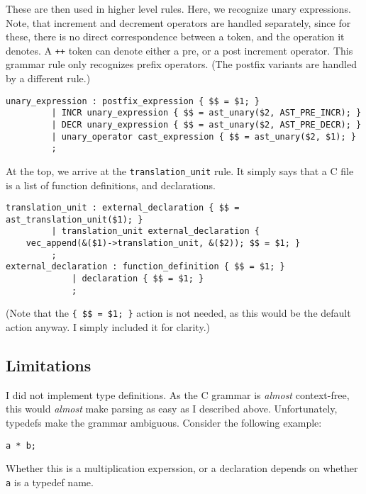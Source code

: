 \documentclass[12pt]{article}
\begin{document}
These are then used in higher level rules. Here, we recognize unary
expressions. Note, that increment and decrement operators are handled
separately, since for these, there is no direct correspondence between a token,
and the operation it denotes. A \texttt{++} token can denote either a pre, or a
post increment operator. This grammar rule only recognizes prefix operators.
(The postfix variants are handled by a different rule.)
\begin{center}
\begin{BVerbatim}
unary_expression : postfix_expression { $$ = $1; }
		 | INCR unary_expression { $$ = ast_unary($2, AST_PRE_INCR); }
		 | DECR unary_expression { $$ = ast_unary($2, AST_PRE_DECR); }
		 | unary_operator cast_expression { $$ = ast_unary($2, $1); }
		 ;
\end{BVerbatim}
\end{center}

At the top, we arrive at the \texttt{translation\_unit} rule. It simply says
that a C file is a list of function definitions, and declarations.
\begin{center}
\begin{BVerbatim}
translation_unit : external_declaration { $$ = ast_translation_unit($1); }
		 | translation_unit external_declaration {
	vec_append(&($1)->translation_unit, &($2)); $$ = $1; }
		 ;
external_declaration : function_definition { $$ = $1; }
		     | declaration { $$ = $1; }
		     ;
\end{BVerbatim}
\end{center}
(Note that the \verb|{ $$ = $1; }| action is not needed, as this would be the
default action anyway. I simply included it for clarity.)

\subsection{Limitations}
I did not implement type definitions. As the C grammar is \emph{almost}
context-free, this would \emph{almost} make parsing as easy as I described
above. Unfortunately, typedefs make the grammar ambiguous. Consider the
following example:
\begin{center}
\begin{BVerbatim}
a * b;
\end{BVerbatim}
\end{center}

Whether this is a multiplication experssion, or a declaration depends on
whether \texttt{a} is a typedef name.
\end{document}
